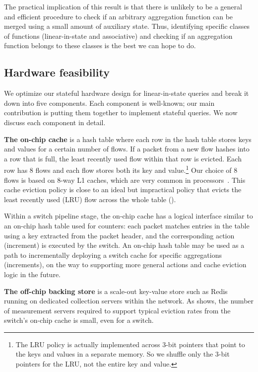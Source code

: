 The practical implication of this result is that there is unlikely to be a
general and efficient procedure to check if an arbitrary aggregation function
can be merged using a small amount of auxiliary state. Thus, identifying
specific classes of functions (\eg linear-in-state and associative) and
checking if an aggregation function belongs to these classes is the best we can
hope to do.

\subsection{Hardware feasibility}
\label{sec:hardware-feasibility}
We optimize our stateful hardware design for linear-in-state queries and break
it down into five components.  Each component is well-known; our main
contribution is putting them together to implement stateful queries.
We now discuss each component in detail.

\textbf{The on-chip cache} is a hash table where each row in the hash table
stores keys and values for a certain number of flows. If a packet from a new
flow hashes into a row that is full, the least recently used flow within that
row is evicted. Each row has 8 flows and each flow stores both its key and
value.\footnote{The LRU policy is actually implemented across 3-bit pointers
that point to the keys and values in a separate memory. So we shuffle only the
3-bit pointers for the LRU, not the entire key and value.} Our choice of 8
flows is based on 8-way L1 caches, which are very common in
processors~\cite{intel_opt_manual}. This cache eviction policy is close to an
ideal but impractical policy that evicts the least recently used (LRU) flow
across the whole table ().

Within a switch pipeline stage, the on-chip cache has a logical interface
similar to an on-chip hash table used for counters:
each packet matches entries in the table using a key
extracted from the packet header, and the corresponding action (\ie increment)
is executed by the switch.
%
An on-chip hash table may be used as a path to incrementally deploying a switch
cache for specific aggregations (\eg increments), on the way to supporting
more general actions and cache eviction logic in the future.

\textbf{The off-chip backing store} is a scale-out key-value store such as
Redis~\cite{redis} running on dedicated collection servers within the network. As 
shows, the number of measurement servers required to support typical eviction
rates from the switch's on-chip cache is small, even for a \hundredgswitch switch.

